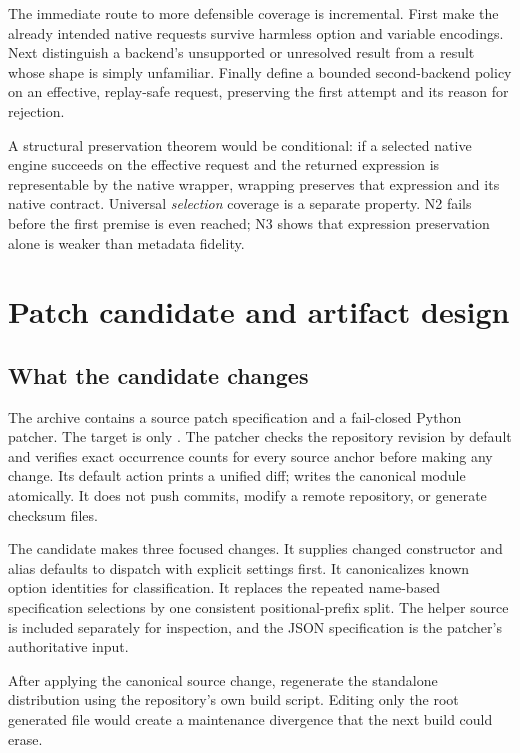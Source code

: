 \documentclass[11pt,a4paper]{article}
\newcommand{\code}[1]{\texttt{\detokenize{#1}}}
\begin{document}
The immediate route to more defensible coverage is incremental. First make the already intended native requests survive harmless option and variable encodings. Next distinguish a backend's unsupported or unresolved result from a result whose shape is simply unfamiliar. Finally define a bounded second-backend policy on an effective, replay-safe request, preserving the first attempt and its reason for rejection.

A structural preservation theorem would be conditional: if a selected native engine succeeds on the effective request and the returned expression is representable by the native wrapper, wrapping preserves that expression and its native contract. Universal \emph{selection} coverage is a separate property. N2 fails before the first premise is even reached; N3 shows that expression preservation alone is weaker than metadata fidelity.

\section{Patch candidate and artifact design}
\label{sec:patch}

\subsection{What the candidate changes}

The archive contains a source patch specification and a fail-closed Python patcher. The target is only \code{src/Kernel/NativeCompatibility.wl}. The patcher checks the repository revision by default and verifies exact occurrence counts for every source anchor before making any change. Its default action prints a unified diff; \code{--apply} writes the canonical module atomically. It does not push commits, modify a remote repository, or generate checksum files.

The candidate makes three focused changes. It supplies changed constructor and alias defaults to dispatch with explicit settings first. It canonicalizes known option identities for classification. It replaces the repeated name-based specification selections by one consistent positional-prefix split. The helper source is included separately for inspection, and the JSON specification is the patcher's authoritative input.

After applying the canonical source change, regenerate the standalone distribution using the repository's own build script. Editing only the root generated file would create a maintenance divergence that the next build could erase.
\end{document}
